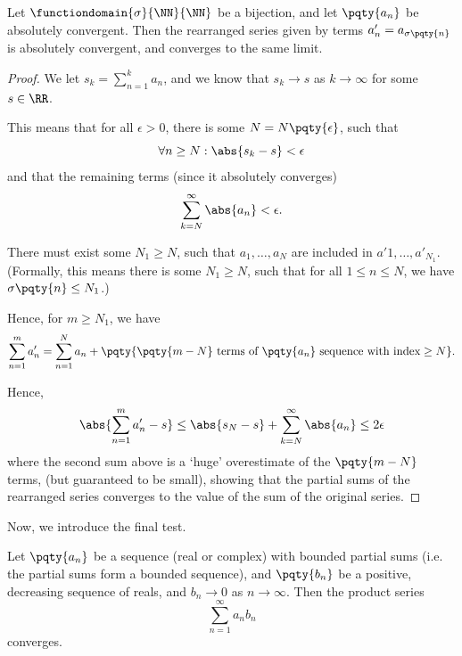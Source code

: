 \begin{proposition}
    \label{prop:ser-rearrangement-absolute-convergence}%
    Let \(\functiondomain{\sigma}{\NN}{\NN}\) be a bijection, and let \(\pqty{a_n}\) be absolutely convergent. Then the rearranged series given by terms \(a_n' = a_{\sigma\pqty{n}}\) is absolutely convergent, and converges to the same limit.
\end{proposition}

\begin{proof}
    We let \(s_k = \sum_{n = 1}^{k} a_n\), and we know that \(s_k \to s\) as \(k \to \infty\) for some \(s \in \RR\).

    This means that for all \(\epsilon > 0\), there is some \(N = N\pqty{\epsilon}\), such that
    \[
        \forall n \geq N: \abs{s_k - s} < \epsilon
    \]
    and that the remaining terms (since it absolutely converges)
    \[
        \sum_{k = N}^{\infty} \abs{a_n} < \epsilon.
    \]

    There must exist some \(N_1 \geq N\), such that \(a_1, \ldots, a_N\) are included in \(a'1, \ldots, a'_{N_1}\). (Formally, this means there is some \(N_1 \geq N\), such that for all \(1 \leq n \leq N\), we have \(\sigma\pqty{n} \leq N_1\).)

    Hence, for \(m \geq N_1\), we have
    \[
        \sum_{n = 1}^{m} a_n' = \sum_{n = 1}^{N} a_n + \pqty{\pqty{m - N} \text{ terms of }\pqty{a_n}\text{ sequence with index}\geq N}.
    \]

    Hence,
    \[
        \abs{\sum_{n = 1}^{m} a_n' - s} \leq \abs{s_N - s} + \sum_{k = N}^{\infty} \abs{a_n} \leq 2\epsilon
    \]
    where the second sum above is a `huge' overestimate of the \(\pqty{m - N}\) terms, (but guaranteed to be small), showing that the partial sums of the rearranged series converges to the value of the sum of the original series.
\end{proof}

Now, we introduce the final test.

\begin{proposition}
    \label{prop:ser-test-dirichlet}%
    Let \(\pqty{a_n}\) be a sequence (real or complex) with bounded partial sums (i.e. the partial sums form a bounded sequence), and \(\pqty{b_n}\) be a positive, decreasing sequence of reals, and \(b_n \to 0\) as \(n \to \infty\). Then the product series
    \[
        \sum_{n = 1}^{\infty} a_n b_n
    \]
    converges.
\end{proposition}


